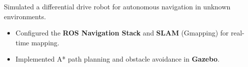 Simulated a differential drive robot for autonomous navigation in unknown environments.
\begin{itemize}
\item Configured the \textbf{ROS Navigation Stack} and \textbf{SLAM} (Gmapping) for real-time mapping.
\item Implemented A* path planning and obstacle avoidance in \textbf{Gazebo}.
\end{itemize}
{\LaTeXraggedright
{}
\par}
